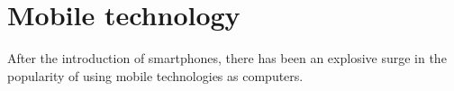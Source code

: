 \section{Mobile technology}

After the introduction of smartphones, there has been an explosive surge in the
popularity of using mobile technologies as computers.
\begin{figure}[!ht]
\centering
{}
\subfigure{
}
\end{figure}
